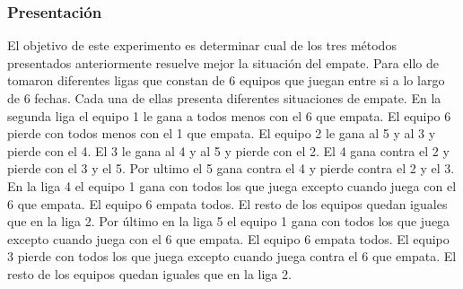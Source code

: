         \subsubsection*{Presentación}
        El objetivo de este experimento es determinar cual de los tres métodos presentados anteriormente resuelve mejor la situación del empate. Para ello de tomaron diferentes ligas que constan de 6 equipos que juegan entre si a lo largo de 6 fechas. Cada una de ellas presenta diferentes situaciones de empate. 
        En la segunda liga el equipo 1 le gana a todos menos con el 6 que empata. El equipo 6 pierde con todos menos con el 1 que empata. El equipo 2 le gana al 5 y al 3 y pierde con el 4. El 3 le gana al 4 y al 5 y pierde con el 2. El 4 gana contra el 2 y pierde con el 3 y el 5. Por ultimo el 5 gana contra el 4 y pierde contra el 2 y el 3. 
        En la liga 4 el equipo 1 gana con todos los que juega excepto cuando juega con el 6 que empata. El equipo 6 empata todos. El resto de los equipos quedan iguales que en la liga 2. 
        Por último en la liga 5 el equipo 1 gana con todos los que juega excepto cuando juega con el 6 que empata. El equipo 6 empata todos. El equipo 3 pierde con todos los que juega excepto cuando juega contra el 6 que empata. El resto de los equipos quedan iguales que en la liga 2.
            
